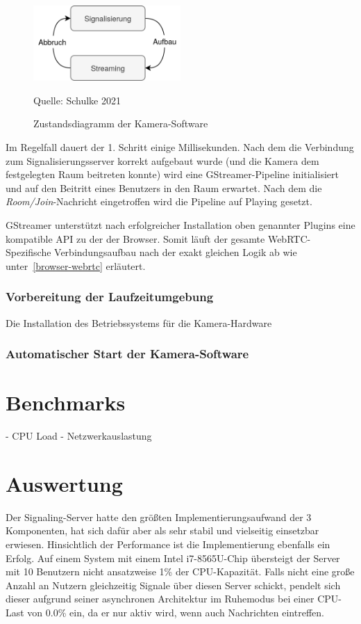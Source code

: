 \documentclass{article}
\newcommand{\figuresource}[1]{
	\begin{center}Quelle: #1\end{center}
}
\begin{document}
\begin{onecolumn}
\begin{figure}[ht]
	\includegraphics[width=0.5\textwidth]{diagram-states}
	\centering
	\caption{Zustandsdiagramm der Kamera-Software}
	\figuresource{Schulke 2021}
\end{figure}

Im Regelfall dauert der 1. Schritt einige Millisekunden. Nach dem die
Verbindung zum Signalisierungsserver korrekt aufgebaut wurde (und die Kamera
dem festgelegten Raum beitreten konnte) wird eine GStreamer-Pipeline
initialisiert und auf den Beitritt eines Benutzers in den Raum erwartet. Nach
dem die \textit{Room/Join}-Nachricht eingetroffen wird die Pipeline auf Playing
gesetzt.

GStreamer unterstützt nach erfolgreicher Installation oben genannter Plugins
eine kompatible API zu der der Browser. Somit läuft der gesamte
WebRTC-Spezifische Verbindungsaufbau nach der exakt gleichen Logik ab wie
unter\ \ref{browser-webrtc} erläutert.

\subsubsection{Vorbereitung der Laufzeitumgebung}

Die Installation des Betriebssystems für die Kamera-Hardware 

\subsubsection{Automatischer Start der Kamera-Software}

\section{Benchmarks}

- CPU Load
- Netzwerkauslastung

\section{Auswertung}

Der Signaling-Server hatte den größten Implementierungsaufwand der 3
Komponenten, hat sich dafür aber als sehr stabil und vielseitig einsetzbar
erwiesen. Hinsichtlich der Performance ist die Implementierung ebenfalls ein
Erfolg. Auf einem System mit einem Intel i7-8565U-Chip übersteigt der Server
mit 10 Benutzern nicht ansatzweise 1\% der CPU-Kapazität. Falls nicht eine
große Anzahl an Nutzern gleichzeitig Signale über diesen Server schickt,
pendelt sich dieser aufgrund seiner asynchronen Architektur im Ruhemodus bei
einer CPU-Last von 0.0\% ein, da er nur aktiv wird, wenn auch Nachrichten
eintreffen.


\end{onecolumn}
\end{document}
